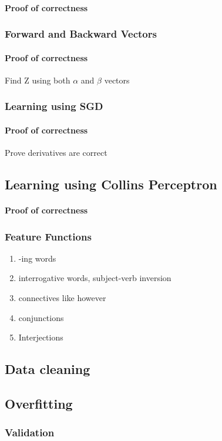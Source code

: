 \documentclass{acm_proc_article-sp}
\begin{document}
\paragraph*{Proof of correctness}
\subsubsection*{Forward and Backward Vectors}
\paragraph*{Proof of correctness}
Find Z using both $\alpha$ and $\beta$ vectors
\subsubsection{Learning using SGD}
\paragraph{Proof of correctness}
Prove derivatives are correct
\subsection{Learning using Collins Perceptron}
\paragraph{Proof of correctness}
\subsubsection{Feature Functions}
\begin{enumerate}
\item -ing words
\item interrogative words, subject-verb inversion
\item connectives like however
\item conjunctions
\item Interjections
\end{enumerate}
\subsection{Data cleaning}
\subsection{Overfitting}
\subsubsection{Validation}
\end{document}
